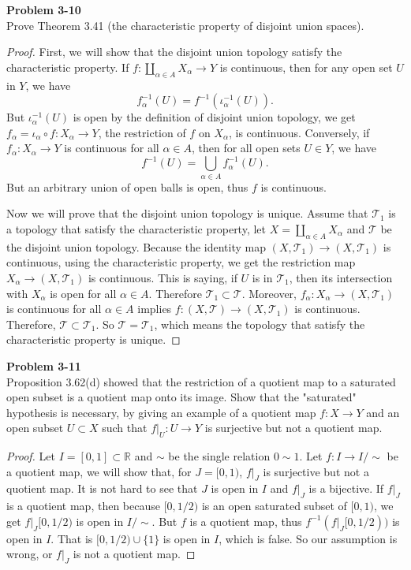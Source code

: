 \documentclass[12pt, a4paper]{article}
\theoremstyle{plain}
\newcommand{\R}{\mathbb{R}}
\newcommand{\T}{\mathcal{T}}
\newenvironment{problem}[2][Problem]
    { \begin{mdframed}[backgroundcolor=gray!20] \textbf{#1 #2} \\}
    {  \end{mdframed}}
\begin{document}
\begin{problem}{3-10}
Prove Theorem 3.41 (the characteristic property of disjoint union spaces).
\end{problem}
	\begin{proof}
	First, we will show that the disjoint union topology satisfy the characteristic property. If $f:\coprod_{\alpha\in A}X_\alpha \rightarrow Y$ is continuous, then for any open set $U$ in $Y$, we have 
	\[
	f^{-1}_\alpha(U)=f^{-1}(\iota_\alpha^{-1}(U)).
	\]
	But $\iota_\alpha^{-1}(U)$ is open by the definition of disjoint union topology, we get $f_\alpha = \iota_\alpha\circ f:X_\alpha\rightarrow Y$, the restriction of $f$ on $X_\alpha$, is continuous. Conversely, if $f_\alpha:X_\alpha\rightarrow Y$ is continuous for all $\alpha\in A$, then for all open sets $U\in Y$, we have
	\[
	f^{-1}(U)=\bigcup_{\alpha\in A}f_\alpha^{-1}(U).
	\]
	But an arbitrary union of open balls is open, thus $f$ is continuous.
	
	Now we will prove that the disjoint union topology is unique. Assume that $\T_1$ is a topology that satisfy the characteristic property, let $X=\coprod_{\alpha\in A}X_\alpha$ and $\T$ be the disjoint union topology. Because the identity map $(X,\T_1)\rightarrow (X,\T_1)$ is continuous, using the characteristic property, we get the restriction map $X_\alpha\rightarrow (X,\T_1)$ is continuous. This is saying, if $U$ is in $\T_1$, then its intersection with $X_\alpha$ is open for all $\alpha\in A$. Therefore $\T_1\subset \T$. Moreover,  $f_\alpha:X_\alpha\rightarrow (X,\T_1)$ is continuous for all $\alpha\in A$ implies $f:(X,\T)\rightarrow (X,\T_1)$ is continuous. Therefore, $\T\subset \T_1$. So $\T=\T_1$, which means the topology that satisfy the characteristic property is unique.
	\end{proof}
	
\begin{problem}{3-11}
Proposition 3.62(d) showed that the restriction of a quotient map to a saturated open subset is a quotient map onto its image. Show that the "saturated" hypothesis is necessary, by giving an example of a quotient map $f:X\rightarrow Y$ and an open subset $U\subset X$ such that $f|_U:U\rightarrow Y$ is surjective but not a quotient map.
\end{problem}
	\begin{proof}
	Let $I=[0,1]\subset \R$ and $\sim$ be the single relation $0\sim 1$. Let $f:I\rightarrow I/\sim$ be a quotient map, we will show that, for $J=[0,1)$, $f|_J$ is surjective but not a quotient map. It is not hard to see that $J$ is open in $I$ and $f|_J$ is a bijective. If $f|_J$ is a quotient map, then because $[0,1/2)$ is an open saturated subset of $[0,1)$, we get $f|_J[0,1/2)$ is open in $I/\sim$. But $f$ is a quotient map, thus $f^{-1}(f|_J[0,1/2))$ is open in $I$. That is $[0,1/2)\cup \{1\}$ is open in $I$, which is false. So our assumption is wrong, or $f|_J$ is not a quotient map.
	\end{proof}
	
\end{document}
